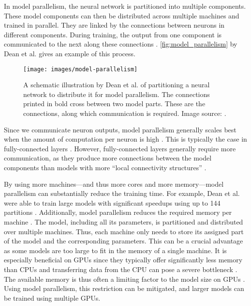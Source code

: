 \documentclass[conference,compsoc,a4paper]{IEEEtran}
\begin{document}
In model parallelism, the neural network is partitioned into multiple components.
These model components can then be distributed across multiple machines and trained in parallel.
They are linked by the connections between neurons in different components.
During training, the output from one component is communicated to the next along these connections \cite{dean2012-Large-scale-distributed}.
\autoref{fig:model_parallelism} by Dean et al. \cite{dean2012-Large-scale-distributed} gives an example of this process.

\begin{figure}[ht]
\centering
\texttt{[image: images/model-parallelism]}
\caption{
A schematic illustration by Dean et al. \cite{dean2012-Large-scale-distributed} of partitioning a neural network to distribute it for model parallelism.
The connections printed in bold cross between two model parts.
These are the connections, along which communication is required.
Image source: \cite{dean2012-Large-scale-distributed}.
}
\label{fig:model_parallelism}
\end{figure}

Since we communicate neuron outputs, model parallelism generally scales best when the amount of computation per neuron is high \cite{krizhevsky2014-One-weird-trick}.
This is typically the case in fully-connected layers \cite{krizhevsky2014-One-weird-trick}.
However, fully-connected layers generally require more communication, as they produce more connections between the model components than models with more ``local connectivity structures'' \cite{dean2012-Large-scale-distributed}.

By using more machines---and thus more cores and more memory---model parallelism can substantially reduce the training time.
For example, Dean et al. were able to train large models with significant speedups using up to 144 partitions \cite{dean2012-Large-scale-distributed}.
%
Additionally, model parallelism reduces the required memory per machine \cite{dean2012-Large-scale-distributed}.
The model, including all its parameters, is partitioned and distributed over multiple machines.
Thus, each machine only needs to store its assigned part of the model and the corresponding parameters.
%
This can be a crucial advantage as some models are too large to fit in the memory of a single machine.
It is especially beneficial on GPUs since they typically offer significantly less memory than CPUs and transferring data from the CPU can pose a severe bottleneck \cite{dean2012-Large-scale-distributed}.
The available memory is thus often a limiting factor to the model size on GPUs \cite{dean2012-Large-scale-distributed,chilimbi2014-Project-Adam}.
Using model parallelism, this restriction can be mitigated, and larger models can be trained using multiple GPUs.
\end{document}
